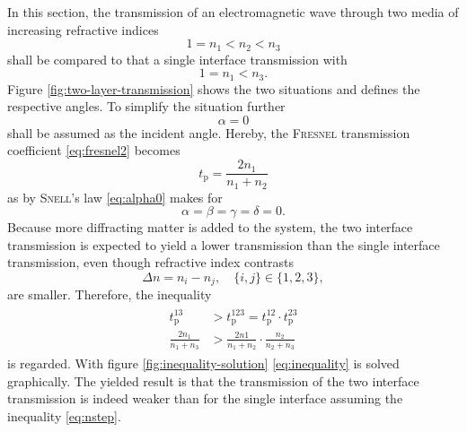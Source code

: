 \documentclass[../thesis.tex]{subfiles}
\begin{document}
            In this section, the transmission of an electromagnetic wave through two media of increasing refractive indices
            \begin{equation}
                1 = n_1 < n_2 < n_3
                \label{eq:nstep}
            \end{equation}
            shall be compared to that a single interface transmission with
            \begin{equation}
                1 = n_1 < n_3.
            \end{equation}
            Figure \cref{fig:two-layer-transmission} shows the two situations and defines the respective angles. To simplify the situation further
            \begin{equation}
                \alpha = 0
                \label{eq:alpha0}
            \end{equation}
            shall be assumed as the incident angle. Hereby, the \textsc{Fresnel} transmission coefficient \cref{eq:fresnel2} becomes
            \begin{equation}
                t_\mathrm{p} = \frac{2n_1}{n_1+n_2}
            \end{equation}
            as by \textsc{Snell}'s law \cref{eq:alpha0} makes for
            \begin{equation}
                \alpha = \beta =\gamma = \delta = 0.
            \end{equation}
            Because more diffracting matter is added to the system, the two interface transmission is expected to yield a lower transmission than the single interface transmission, even though refractive index contrasts
            \begin{equation}
                \Delta n = n_i - n_j, \quad \{i,j\}\in\{1,2,3\},
            \end{equation}
            are smaller. Therefore, the inequality
            \begin{align}
                \begin{split}
                    t_\mathrm{p}^{13} &> t_\mathrm{p}^{123} = t_\mathrm{p}^{12} \cdot t_\mathrm{p}^{23}\\
                    \frac{2n_1}{n_1+n_3} &> \frac{2n1}{n_1+n_2}\cdot\frac{n_2}{n_2+n_3}
                \end{split}
                \label{eq:inequality}
            \end{align}
            is regarded. With figure \cref{fig:inequality-solution} \cref{eq:inequality} is solved graphically. The yielded result is that the transmission of the two interface transmission is indeed weaker than for the single interface assuming the inequality \cref{eq:nstep}.
\end{document}
